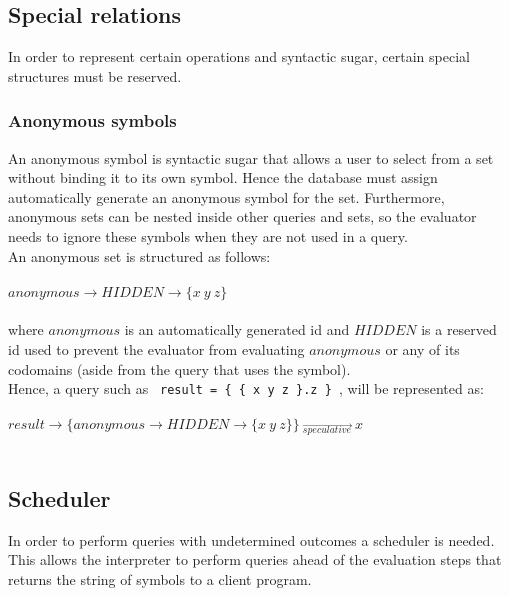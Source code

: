 \documentclass[a4paper,11pt]{article}
\begin{document}
\subsection{Special relations}
In order to represent certain operations and syntactic sugar, certain special structures must be reserved.

\subsubsection{Anonymous symbols}
An anonymous symbol is syntactic sugar that allows a user to select from a set without binding it to its own symbol. 
Hence the database must assign automatically generate an anonymous symbol for the set.
Furthermore, anonymous sets can be nested inside other queries and sets, so the evaluator needs to ignore these symbols when they are not used in a query.\\

An anonymous set is structured as follows:\\\\
$anonymous \rightarrow HIDDEN \rightarrow \{ x\ y\ z \}$\\\\
where $anonymous$ is an automatically generated id and $HIDDEN$ is a reserved id used to prevent the evaluator from evaluating $anonymous$ or any of its codomains (aside from the query that uses the symbol).\\

Hence, a query such as \texttt{ result = \{ \{ x y z \}.z \} }, will be represented as:\\\\
$result \rightarrow \{ anonymous \rightarrow HIDDEN \rightarrow \{ x\ y\ z \} \}\ \overrightarrow{_{speculative}}\ x$\\\\


\subsection{Scheduler}
In order to perform queries with undetermined outcomes a scheduler is needed. 
This allows the interpreter to perform queries ahead of the evaluation steps that returns the string of symbols to a client program.
\end{document}
